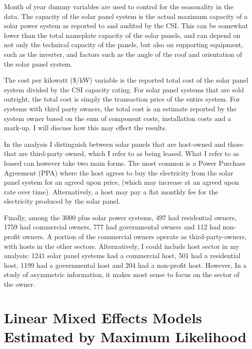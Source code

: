 \documentclass[12pt]{article}
\begin{document}
Month of year dummy variables are used to control for the seasonality in the data. The capacity of the solar panel system is the actual maximum capacity of a solar power system as reported to and audited by the CSI. This can be somewhat lower than the total nameplate capacity of the solar panels, and can depend on not only the technical capacity of the panels, but also on supporting equipment, such as the inverter, and factors such as the angle of the roof and orientation of the solar panel system.

The cost per kilowatt (\$/kW) variable is the reported total cost of the solar panel system divided by the CSI capacity rating. For solar panel systems that are sold outright, the total cost is simply the transaction price of the entire system. For systems with third party owners, the total cost is an estimate reported by the system owner based on the sum of component costs, installation costs and a mark-up. I will discuss how this may effect the results.

In the analysis I distinguish between solar panels that are host-owned and those that are third-party owned, which I refer to as being leased. What I refer to as leased can however take two main forms. The most common is a Power Purchase Agreement (PPA) where the host agrees to buy the electricity from the solar panel system for an agreed upon price, (which may increase at an agreed upon rate over time). Alternatively, a host may pay a flat monthly fee for the electricity produced by the solar panel.

Finally, among the 3000 plus solar power systems, 497 had residential owners, 1759 had commercial owners, 777 had governmental owners and 112 had non-profit owners. A portion of the commercial owners operate as third-party-owners, with hosts in the other sectors. Alternatively, I could include host sector in my analysis: 1241 solar panel systems had a commercial host, 501 had a residential host, 1199 had a governmental host and 204 had a non-profit host. However, In a study of asymmetric information, it makes most sense to focus on the sector of the owner.


\section{Linear Mixed Effects Models Estimated by Maximum Likelihood}
\end{document}

